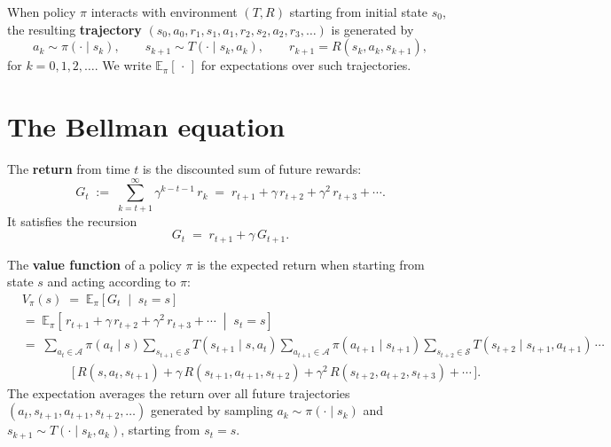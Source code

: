 \documentclass[11pt]{article}
\newcommand{\cS}{\mathcal{S}}
\newcommand{\cA}{\mathcal{A}}
\begin{document}
\begin{definition}[Trajectory]\label{def:trajectory}
When policy $\pi$ interacts with environment $(T, R)$ starting from initial state $s_0$, the resulting \textbf{trajectory} $(s_0, a_0, r_1, s_1, a_1, r_2, s_2, a_2, r_3, \ldots)$ is generated by
\[
    a_k \sim \pi(\cdot \mid s_k), \qquad s_{k+1} \sim T(\cdot \mid s_k, a_k), \qquad r_{k+1} = R(s_k, a_k, s_{k+1}),
\]
for $k = 0, 1, 2, \ldots$. We write $\mathbb{E}_\pi[\,\cdot\,]$ for expectations over such trajectories.
\end{definition}


\section{The Bellman equation}\label{prob:bellman}

\begin{definition}[Return]\label{def:return}
The \textbf{return} from time $t$ is the discounted sum of future rewards:
$$
G_t \;:=\; \sum_{k=t+1}^{\infty} \gamma^{k-t-1}\, r_k \;=\; r_{t+1} + \gamma\, r_{t+2} + \gamma^2\, r_{t+3} + \cdots.
$$
It satisfies the recursion
$$
G_t \;=\; r_{t+1} + \gamma\, G_{t+1}.
$$
\end{definition}

\begin{definition}\label{def:value}
The \textbf{value function} of a policy $\pi$ is the expected return when starting from state $s$ and acting according to $\pi$:
\begin{align*}
&V_\pi(s) \;=\; \mathbb{E}_\pi\!\left[G_t \;\middle|\; s_t = s\right] \\
&=\; \mathbb{E}_\pi\!\left[\,r_{t+1} + \gamma\, r_{t+2} + \gamma^2\, r_{t+3} + \cdots \;\middle|\; s_t = s\right] \\
&=\; \sum_{a_t \in \cA} \pi(a_t \mid s)\! \sum_{s_{t+1} \in \cS} \!T(s_{t+1} \mid s, a_t)\! \sum_{a_{t+1} \in \cA} \pi(a_{t+1} \mid s_{t+1})\! \sum_{s_{t+2} \in \cS} \!T(s_{t+2} \mid s_{t+1}, a_{t+1})\, \cdots \\
&\qquad\qquad \bigl[\, R(s, a_t, s_{t+1}) + \gamma\, R(s_{t+1}, a_{t+1}, s_{t+2}) + \gamma^2\, R(s_{t+2}, a_{t+2}, s_{t+3}) + \cdots \,\bigr].
\end{align*}
The expectation averages the return over all future trajectories $(a_t, s_{t+1}, a_{t+1}, s_{t+2}, \ldots)$ generated by sampling $a_k \sim \pi(\cdot \mid s_k)$ and $s_{k+1} \sim T(\cdot \mid s_k, a_k)$, starting from $s_t = s$.
\end{definition}
\end{document}
